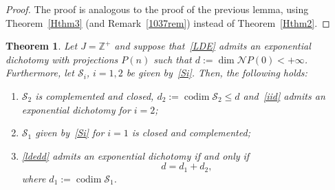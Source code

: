 \documentclass[11pt,reqno,a4paper]{amsart}
\theoremstyle{plain}
\numberwithin{equation}{section}
\newtheorem{theorem}{Theorem}
\theoremstyle{remark}
\DeclareMathOperator{\codim}{codim}
\begin{document}
\begin{proof}
The proof is analogous to the proof of the previous lemma, using Theorem~\ref{Hthm3} (and Remark~\ref{1037rem}) instead of Theorem~\ref{Hthm2}. 
\end{proof}



\begin{theorem}\label{thm7}
Let $J=\mathbb Z^+$ and suppose that~\eqref{LDE} admits an exponential dichotomy with projections $P(n)$ such that $d:=\dim \mathcal N P(0)<+\infty$. Furthermore, let $\mathcal S_i$, $i=1, 2$ be given by~\eqref{Si}.  Then, the following holds:
\begin{enumerate}
    \item  $\mathcal S_2$ is complemented and closed,  $d_2:=\codim \mathcal S_2 \le d$ and~\eqref{iid} admits an exponential dichotomy for $i=2$;
    \item $\mathcal S_1$ given by~\eqref{Si} for $i=1$ is closed and complemented;
    \item \eqref{ldedd} admits an exponential dichotomy if and only if
    \begin{equation}\label{dddeq}d=d_1+d_2,\end{equation} where $d_1:=\codim \mathcal S_1$.
    \end{enumerate} 
\end{theorem}
\end{document}
